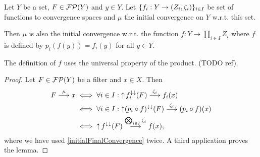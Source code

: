 \begin{lemma} \label{initialConvergenceWrtOneFunction}
Let $Y$ be a set, $F\in \operatorname{\mathcal{FP}}(Y)$ and $y\in Y$. Let $\{f_i: Y\to \left( Z_i, \zeta_i \right)\}_{i\in I}$ be set of functions to convergence spaces and $\mu$ the initial convergence on $Y$ w.r.t. this set.

Then $\mu$ is also the initial convergence w.r.t. the function $f: Y\to \prod_{i\in I}Z_i$ where $f$ is defined by $p_i(f(y)) = f_i(y)$ for all $y\in Y$.
\end{lemma}
The definition of $f$ uses the universal property of the product. (TODO ref).
\begin{proof}
Let $F\in \operatorname{\mathcal{FP}}(Y)$ be a filter and $x\in X$. Then
\begin{align*}
F \overset{\mu}{\longrightarrow} x &\iff \forall i\in I:  \operatorname{\uparrow} f_i^{\downarrow\downarrow}(F) \overset{\zeta_i}{\longrightarrow} f_i(x) \\
&\iff \forall i\in I: \operatorname{\uparrow} (p_i\circ f)^{\downarrow\downarrow}(F) \overset{\zeta_i}{\longrightarrow} (p_i\circ f)(x) \\
&\iff  \operatorname{\uparrow} f^{\downarrow\downarrow}(F) \overset{\bigotimes_{i\in I}\zeta_i}{\longrightarrow} f(x),
\end{align*}
where we have used \ref{initialFinalConvergence} twice. A third application proves the lemma.
\end{proof}

